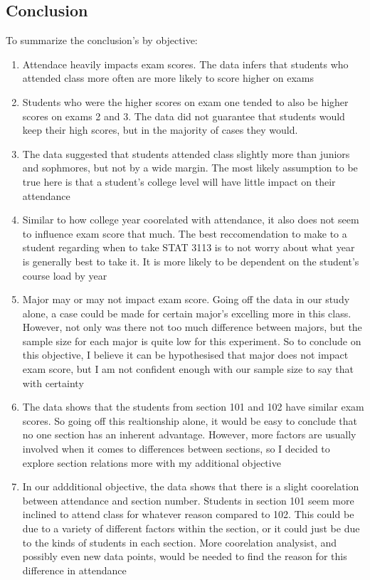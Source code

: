 \documentclass[14pt]{article}
\begin{document}
\begin{enumerate}
\pagebreak

\end{enumerate}


\subsection*{Conclusion}
To summarize the conclusion's by objective: 

\begin{enumerate}
\item Attendace heavily impacts exam scores. The data infers that students who attended class more often are more likely to score higher on exams
\item Students who were the higher scores on exam one tended to also be higher scores on exams 2 and 3. The data did not guarantee that students would keep their high scores, but in the majority of cases they would.
\item The data suggested that students attended class slightly more than juniors and sophmores, but not by a wide margin. The most likely assumption to be true here is that a student's college level will have little impact on their attendance
\item Similar to how college year coorelated with attendance, it also does not seem to influence exam score that much. The best reccomendation to make to a student regarding when to take STAT 3113 is to not worry about what year is generally best to take it. It is more likely to be dependent on the student's course load by year 
\item Major may or may not impact exam score. Going off the data in our study alone, a case could be made for certain major's excelling more in this class. However, not only was there not too much difference between majors, but the sample size for each major is quite low for this experiment. So to conclude on this objective, I believe it can be hypothesised that major does not impact exam score, but I am not confident enough with our sample size to say that with certainty
\item The data shows that the students from section 101 and 102 have similar exam scores. So going off this realtionship alone, it would be easy to conclude that no one section has an inherent advantage. However, more factors are usually involved when it comes to differences between sections, so I decided to explore section relations more with my additional objective
\item In our addditional objective, the data shows that there is a slight coorelation between attendance and section number. Students in section 101 seem more inclined to attend class for whatever reason compared to 102. This could be due to a variety of different factors within the section, or it could just be due to the kinds of students in each section. More coorelation analysist, and possibly even new data points, would be needed to find the reason for this difference in attendance
\end{enumerate}
\end{document}
